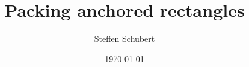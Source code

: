 \documentclass[aspectratio=169]{beamer}
\title[SHORT TITLE]{Packing anchored rectangles}
\subtitle{Steffen Schubert}
\date{\today}
\begin{document}
\begin{frame}
	\maketitle
\end{frame}




\end{document}
